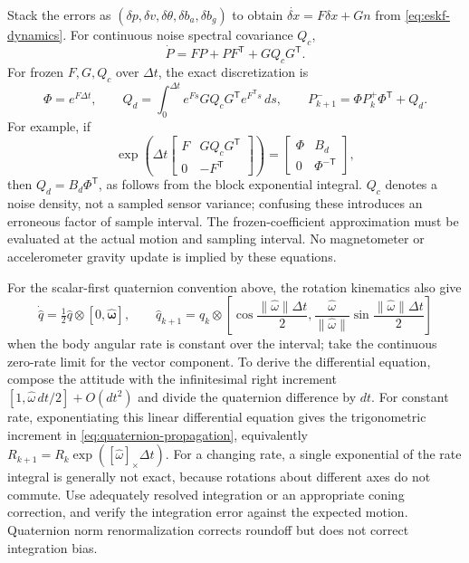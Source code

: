 Stack the errors as $(\delta p,\delta v,\delta\theta,\delta b_a,
\delta b_g)$ to obtain $\dot{\delta x}=F\delta x+G n$ from
\eqref{eq:eskf-dynamics}. For continuous noise spectral covariance $Q_c$,
\begin{equation}
 \dot P=FP+PF^{\mathsf T}+GQ_cG^{\mathsf T}.
\end{equation}
For frozen $F,G,Q_c$ over $\Delta t$, the exact discretization is
\begin{equation}
 \Phi=e^{F\Delta t},\qquad
 Q_d=\int_0^{\Delta t}e^{Fs}GQ_cG^{\mathsf T}e^{F^{\mathsf T}s}\,ds,
 \qquad P^-_{k+1}=\Phi P^+_k\Phi^{\mathsf T}+Q_d.
\end{equation}
For example, if
\begin{equation}
 \exp\left(\Delta t\begin{bmatrix}F&GQ_cG^{\mathsf T}\\0&-F^{\mathsf T}
                         \end{bmatrix}\right)
 =\begin{bmatrix}\Phi&B_d\\0&\Phi^{-\mathsf T}\end{bmatrix},
\end{equation}
then $Q_d=B_d\Phi^{\mathsf T}$, as follows from the block exponential
integral. $Q_c$ denotes a noise density, not a sampled sensor variance;
confusing these introduces an erroneous factor of sample interval.
The frozen-coefficient approximation must be evaluated at the actual
motion and sampling interval. No magnetometer or accelerometer gravity
update is implied by these equations.

For the scalar-first quaternion convention above, the rotation
kinematics also give
\begin{equation}
 \dot{\widehat q}=\tfrac12\widehat q\otimes
                  [0,\widehat{\boldsymbol\omega}],\qquad
 \widehat q_{k+1}=\widehat q_k\otimes
 \left[\cos\frac{\|\widehat\omega\|\Delta t}{2},
 \frac{\widehat\omega}{\|\widehat\omega\|}
                    \sin\frac{\|\widehat\omega\|\Delta t}{2}\right]
 \label{eq:quaternion-propagation}
\end{equation}
when the body angular rate is constant over the interval; take the
continuous zero-rate limit for the vector component. To derive the
differential equation, compose the attitude with the infinitesimal
right increment $[1,\widehat\omega\,dt/2]+O(dt^2)$ and divide the
quaternion difference by $dt$. For constant rate, exponentiating this
linear differential equation gives the trigonometric increment in
\eqref{eq:quaternion-propagation}, equivalently
$R_{k+1}=R_k\exp([\widehat\omega]_\times\Delta t)$. For a changing
rate, a single exponential of the rate integral is generally not exact,
because rotations about different axes do not commute. Use adequately
resolved integration or an appropriate coning correction, and verify
the integration error against the expected motion. Quaternion norm
renormalization corrects roundoff but does not correct integration bias.


